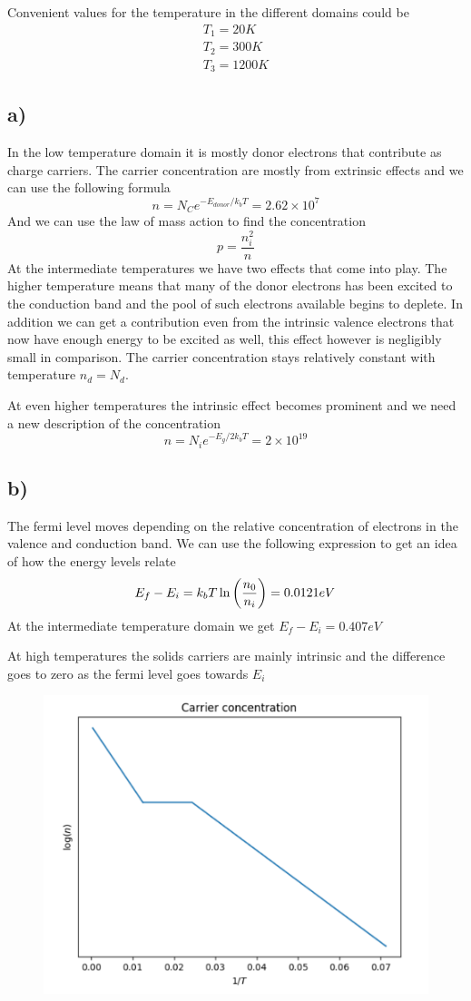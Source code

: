 \documentclass{article}
\begin{document}
Convenient values for the temperature in the different domains could be
\begin{align*}
	T_1 = 20K\\
	T_2 = 300K\\
	T_3 = 1200K
\end{align*}

\subsection*{a)}

In the low temperature domain it is mostly donor electrons that contribute as charge carriers. The carrier concentration are mostly from extrinsic effects and we can use the following formula
\begin{equation}
	n = N_Ce^{-E_{donor}/k_bT}=2.62\times10^7
\end{equation}
And we can use the law of mass action to find the concentration
\begin{equation*}
	p = \frac{n_i^2}{n}
\end{equation*}
At the intermediate temperatures we have two effects that come into play. The higher temperature means that many of the donor electrons has been excited to the conduction band and the pool of such electrons available begins to deplete. In addition we can get a contribution even from the intrinsic valence electrons that now have enough energy to be excited as well, this effect however is negligibly small in comparison.
The carrier concentration stays relatively constant with temperature $n_d=N_d$.

At even higher temperatures the intrinsic effect becomes prominent and we need a new description of the concentration
\begin{equation*}
	n = N_ie^{-E_g/2k_bT} = 2\times 10^{19}
\end{equation*}

\subsection*{b)}
The fermi level moves depending on the relative concentration of electrons in the valence and conduction band.
We can use the following expression to get an idea of how the energy levels relate
\begin{equation*}
	E_f - E_i = k_bT\ln\qty(\frac{n_0}{n_i}) = 0.0121eV
\end{equation*}
At the intermediate temperature domain we get $E_f-E_i = 0.407eV$

At high temperatures the solids carriers are mainly intrinsic and the difference goes to zero as the fermi level goes towards $E_i$

\begin{figure}
	\includegraphics[width = 0.7\linewidth]{concentration.png}
	\centering
\end{figure}
\end{document}
